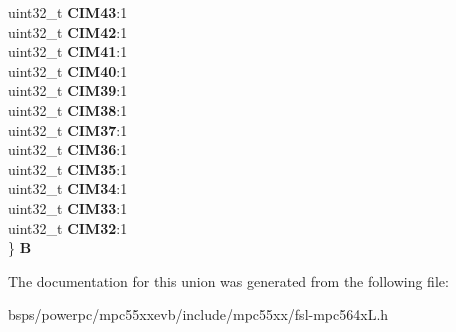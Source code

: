 \begin{DoxyCompactItemize}
\begin{tabbing}
\>uint32\_t {\bfseries CIM43}:1\\
\>uint32\_t {\bfseries CIM42}:1\\
\>uint32\_t {\bfseries CIM41}:1\\
\>uint32\_t {\bfseries CIM40}:1\\
\>uint32\_t {\bfseries CIM39}:1\\
\>uint32\_t {\bfseries CIM38}:1\\
\>uint32\_t {\bfseries CIM37}:1\\
\>uint32\_t {\bfseries CIM36}:1\\
\>uint32\_t {\bfseries CIM35}:1\\
\>uint32\_t {\bfseries CIM34}:1\\
\>uint32\_t {\bfseries CIM33}:1\\
\>uint32\_t {\bfseries CIM32}:1\\
\} {\bfseries B}\\

\end{tabbing}\end{DoxyCompactItemize}


The documentation for this union was generated from the following file\+:\begin{DoxyCompactItemize}
\item 
bsps/powerpc/mpc55xxevb/include/mpc55xx/fsl-\/mpc564x\+L.\+h\end{DoxyCompactItemize}
